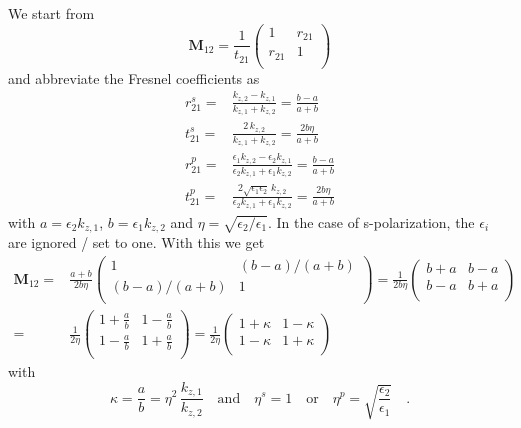 We start from 
\begin{equation}
\mathbf{M}_{12} = \frac{1}{t_{21}} 
\begin{pmatrix}
1 & r_{21} \\ r_{21} & 1 \\
\end{pmatrix}
\end{equation}
and abbreviate the Fresnel coefficients as
\begin{align}
  r_{21}^s = & \frac{k_{z,2} - k_{z,1}}{k_{z,1} + k_{z,2}}  = \frac{b - a}{a + b} \\
 t_{21}^s = & \frac{2 \, k_{z,2}}{k_{z,1} + k_{z,2}} =   \frac{2 b \eta }{a + b}   \\
  r_{21}^p = & \frac{\epsilon_1	 k_{z,2} - \epsilon_2 k_{z,1}}
				  {\epsilon_2 k_{z,1} + \epsilon_1 k_{z,2}}  =   \frac{b - a}{a + b}\\
  t_{21}^p = & \frac{2 \sqrt{\epsilon_1 \epsilon_2}	 \,k_{z,2} }
				  {\epsilon_2 k_{z,1} + \epsilon_1 k_{z,2}}  =   \frac{2 b  \eta }{a + b} 
\end{align}
with $a = \epsilon_2 k_{z,1}$, $b =     \epsilon_1 k_{z,2}$ and $\eta = \sqrt{\epsilon_2 / \epsilon_1}$. In the case of s-polarization, the $\epsilon_i$ are ignored / set to one. With this we get
\begin{align}
\mathbf{M}_{12} = & \frac{a+b}{2 b \eta} 
\begin{pmatrix}
1 & (b-a)/(a+b) \\  (b-a)/(a+b) & 1 \\
\end{pmatrix}
= 
 \frac{1}{2 b \eta} 
\begin{pmatrix}
b+a & b-a \\  b-a & b+a \\
\end{pmatrix} \\
= &
 \frac{1}{2  \eta} 
\begin{pmatrix}
1+\frac{a}{b} & 1- \frac{a}{b} \\  1- \frac{a}{b} & 1+\frac{a}{b} \\
\end{pmatrix}
= 
 \frac{1}{2  \eta} 
\begin{pmatrix}
1+\kappa & 1- \kappa \\  1- \kappa & 1+\kappa \\
\end{pmatrix} 
\end{align}
with 
\begin{equation}
\kappa = \frac{a}{b} = \eta^2 \,
\frac{  k_{z,1} }{ k_{z,2}}
\quad
\text{and}
\quad
\eta^s = 1 \quad \text{or} \quad \eta^p = \sqrt{ \frac{\epsilon_2}{\epsilon_1} } \quad .
\end{equation}


\printbibliography[segment=\therefsegment,heading=subbibliography]
